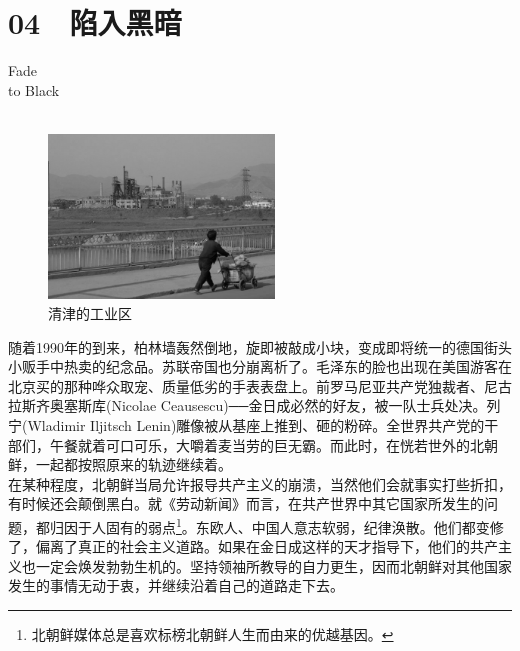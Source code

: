 \fancyhead[RO]{{\tiny{\textcolor{Gray}{\FA \ }}}\thepage}
\fancyhead[LE]{{\tiny{\textcolor{Gray}{\FA \ }}}\thepage}
\fancyfoot[LE,RO]{}
\fancyfoot[LO,CE]{}
\fancyfoot[CO,RE]{}
\chapter*{04 {\FA } 陷入黑暗}
\vspace{5mm}
\begin{flushright}
	\textcolor{PinYinColor}{\EN \huge{Fade\\
	to Black\\
	\ \\}}
\end{flushright}
\begin{figure}[!htbp]
	\centering
	\includegraphics[width=6cm]{./Chapters/Images/04.jpg}
	\caption*{清津的工业区}
\end{figure}


随着1990年的到来，柏林墙轰然倒地，旋即被敲成小块，变成即将统一的德国街头小贩手中热卖的纪念品。苏联帝国也分崩离析了。毛泽东的脸也出现在美国游客在北京买的那种哗众取宠、质量低劣的手表表盘上。前罗马尼亚共产党独裁者、尼古拉斯齐奥塞斯库(Nicolae Ceausescu)──金日成必然的好友，被一队士兵处决。列宁(Wladimir Iljitsch Lenin)雕像被从基座上推到、砸的粉碎。全世界共产党的干部们，午餐就着可口可乐，大嚼着麦当劳的巨无霸。而此时，在恍若世外的北朝鲜，一起都按照原来的轨迹继续着。\\

在某种程度，北朝鲜当局允许报导共产主义的崩溃，当然他们会就事实打些折扣，有时候还会颠倒黑白。就《劳动新闻》而言，在共产世界中其它国家所发生的问题，都归因于人固有的弱点\footnote{北朝鲜媒体总是喜欢标榜北朝鲜人生而由来的优越基因。}。东欧人、中国人意志软弱，纪律涣散。他们都变修了，偏离了真正的社会主义道路。如果在金日成这样的天才指导下，他们的共产主义也一定会焕发勃勃生机的。坚持领袖所教导的自力更生，因而北朝鲜对其他国家发生的事情无动于衷，并继续沿着自己的道路走下去。\\

